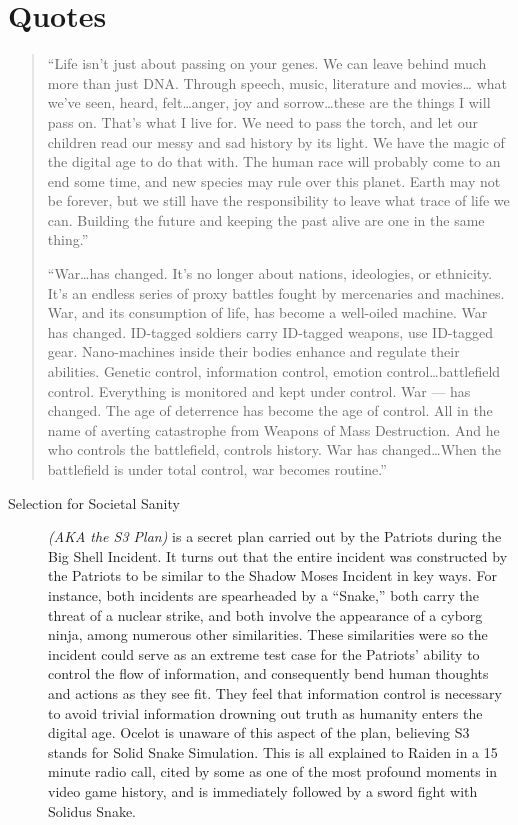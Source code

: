 \documentclass[12pt]{article}
\begin{document}
\section*{Quotes}
\begin{quote}
	``Life isn't just about passing on your genes. We can leave behind much
	more than just DNA. Through speech, music, literature and movies\ldots
	what we've seen, heard, felt\ldots anger, joy and sorrow\ldots these
	are the things I will pass on. That's what I live for. We need to pass
	the torch, and let our children read our messy and sad history by its
	light. We have the magic of the digital age to do that with. The human
	race will probably come to an end some time, and new species may rule
	over this planet. Earth may not be forever, but we still have the
	responsibility to leave what trace of life we can. Building the future
	and keeping the past alive are one in the same thing.''

	``War\ldots has changed. It's no longer about nations, ideologies, or
	ethnicity. It's an endless series of proxy battles fought by
	mercenaries and machines. War, and its consumption of life, has become
	a well-oiled machine. War has changed. ID-tagged soldiers carry
	ID-tagged weapons, use ID-tagged gear. Nano-machines inside their
	bodies enhance and regulate their abilities. Genetic control,
	information control, emotion control\ldots battlefield control.
	Everything is monitored and kept under control. War --- has changed.
	The age of deterrence has become the age of control. All in the name of
	averting catastrophe from Weapons of Mass Destruction. And he who
	controls the battlefield, controls history. War has changed\ldots When
	the battlefield is under total control, war becomes routine.''
\end{quote}

\pagebreak

\begin{description}
	\item [Selection for Societal Sanity] \textit{(AKA the S3 Plan)} is a
		secret plan carried out by the Patriots during the Big Shell
		Incident. It turns out that the entire incident was constructed
		by the Patriots to be similar to the Shadow Moses Incident in
		key ways. For instance, both incidents are spearheaded by a
		``Snake,'' both carry the threat of a nuclear strike, and both
		involve the appearance of a cyborg ninja, among numerous other
		similarities. These similarities were so the incident could
		serve as an extreme test case for the Patriots' ability to
		control the flow of information, and consequently bend human
		thoughts and actions as they see fit. They feel that
		information control is necessary to avoid trivial information
		drowning out truth as humanity enters the digital age. Ocelot
		is unaware of this aspect of the plan, believing S3 stands for
		Solid Snake Simulation. This is all explained to Raiden in a 15
		minute radio call, cited by some as one of the most profound
		moments in video game history, and is immediately followed by a
		sword fight with Solidus Snake.
\end{description}
\end{document}

